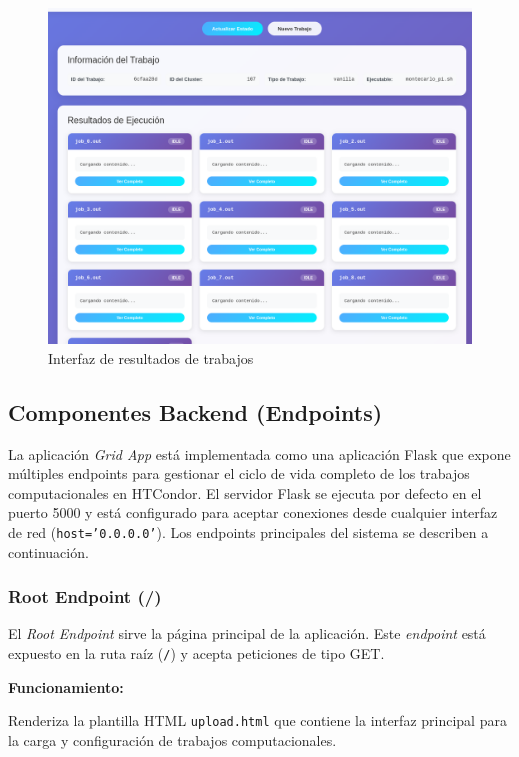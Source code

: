 \begin{figure}[H]
	\centering
	\includegraphics[scale=0.35]{tablas-images/pmv/results-ui-screenshot.png}
	\caption{Interfaz de resultados de trabajos}
	\label{fig:uiResultadosTrabajos}
\end{figure}

\subsection{Componentes Backend (Endpoints)}
\noindent

La aplicación \textit{Grid App} está implementada como una aplicación Flask que expone múltiples endpoints para gestionar el ciclo de vida completo de los trabajos computacionales en HTCondor. El servidor Flask se ejecuta por defecto en el puerto 5000 y está configurado para aceptar conexiones desde cualquier interfaz de red (\texttt{host='0.0.0.0'}). Los endpoints principales del sistema se describen a continuación.

\subsubsection{Root Endpoint (/)}
\noindent

El \textit{Root Endpoint} sirve la página principal de la aplicación. Este \textit{endpoint} está expuesto en la ruta raíz (\texttt{/}) y acepta peticiones de tipo GET.

\textbf{Funcionamiento:}

Renderiza la plantilla HTML \texttt{upload.html} que contiene la interfaz principal para la carga y configuración de trabajos computacionales.


